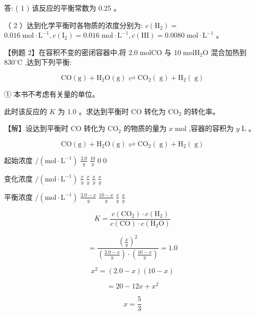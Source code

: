 \documentclass[10pt]{article}
\begin{document}
答: ( 1 ) 该反应的平衡常数为 0.25 。

（ 2 ）达到化学平衡时各物质的浓度分别为: \(c\left( {\mathrm{H}}_{2}\right) =\) \({0.016}\mathrm{\;{mol}} \cdot {\mathrm{L}}^{-1},c\left( {\mathrm{I}}_{2}\right) = {0.016}\mathrm{\;{mol}} \cdot {\mathrm{L}}^{-1},c\left( \mathrm{{HI}}\right) = {0.0080}\mathrm{\;{mol}} \cdot {\mathrm{L}}^{-1}\) 。

【例题 2】在容积不变的密闭容器中,将 \({2.0}\mathrm{\;{mol}}\mathrm{{CO}}\) 与 \({10}\mathrm{\;{mol}}{\mathrm{H}}_{2}\mathrm{O}\) 混合加热到 \({830}^{ \circ }\mathrm{C}\) ,达到下列平衡:

\[
\mathrm{{CO}}\left( \mathrm{g}\right) + {\mathrm{H}}_{2}\mathrm{O}\left( \mathrm{g}\right) \rightleftharpoons {\mathrm{{CO}}}_{2}\left( \mathrm{\;g}\right) + {\mathrm{H}}_{2}\left( \mathrm{\;g}\right)
\]

① 本书不考虑有关量的单位。

此时该反应的 \(K\) 为 1.0 。求达到平衡时 \(\mathrm{{CO}}\) 转化为 \({\mathrm{{CO}}}_{2}\) 的转化率。

【解】设达到平衡时 \(\mathrm{{CO}}\) 转化为 \({\mathrm{{CO}}}_{2}\) 的物质的量为 \(x\mathrm{\;{mol}}\) ,容器的容积为 \(y\mathrm{\;L}\) 。

\[
\mathrm{{CO}}\left( \mathrm{g}\right) + {\mathrm{H}}_{2}\mathrm{O}\left( \mathrm{g}\right) \rightleftharpoons {\mathrm{{CO}}}_{2}\left( \mathrm{\;g}\right) + {\mathrm{H}}_{2}\left( \mathrm{\;g}\right)
\]

起始浓度 \(/\left( {\mathrm{{mol}} \cdot {\mathrm{L}}^{-1}}\right) \;\frac{2.0}{y}\;\frac{10}{y}\;0\;0\)

变化浓度 \(/\left( {\mathrm{{mol}} \cdot {\mathrm{L}}^{-1}}\right) \;\frac{x}{y}\;\frac{x}{y}\;\frac{x}{y}\;\frac{x}{y}\)

平衡浓度 \(/\left( {\mathrm{{mol}} \cdot {\mathrm{L}}^{-1}}\right) \;\frac{{2.0} - x}{y}\;\frac{{10} - x}{y}\;\frac{x}{y}\;\frac{x}{y}\)

\[
K = \frac{c\left( {\mathrm{{CO}}}_{2}\right) \cdot c\left( {\mathrm{H}}_{2}\right) }{c\left( \mathrm{{CO}}\right) \cdot c\left( {{\mathrm{H}}_{2}\mathrm{O}}\right) }
\]

\[
= \frac{{\left( \frac{x}{y}\right) }^{2}}{\left( \frac{{2.0} - x}{y}\right) \cdot \left( \frac{{10} - x}{y}\right) } = {1.0}
\]

\[
{x}^{2} = \left( {{2.0} - x}\right) \left( {{10} - x}\right)
\]

\[
= {20} - {12x} + {x}^{2}
\]

\[
x = \frac{5}{3}
\]
\end{document}
